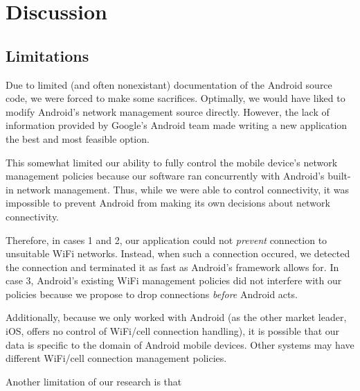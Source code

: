 \section{Discussion}
\label{sec:disc}


\subsection{Limitations}

Due to limited (and often nonexistant) documentation of the Android source code, we were forced to make some sacrifices. Optimally, we would have liked to modify Android's network management source directly. However, the lack of information provided by Google's Android team made writing a new application the best and most feasible option.

This somewhat limited our ability to fully control the mobile device's network management policies because our software ran concurrently with Android's built-in network management. Thus, while we were able to control connectivity, it was impossible to prevent Android from making its own decisions about network connectivity.

Therefore, in cases 1 and 2, our application could not \emph{prevent} connection to unsuitable WiFi networks. Instead, when such a connection occured, we detected the connection and terminated it as fast as Android's framework allows for. In case 3, Android's existing WiFi management policies did not interfere with our policies because we propose to drop connections \emph{before} Android acts.

Additionally, because we only worked with Android (as the other market leader, iOS, offers no control of WiFi/cell connection handling), it is possible that our data is specific to the domain of Android mobile devices. Other systems may have different WiFi/cell connection management policies.

Another limitation of our research is that 
